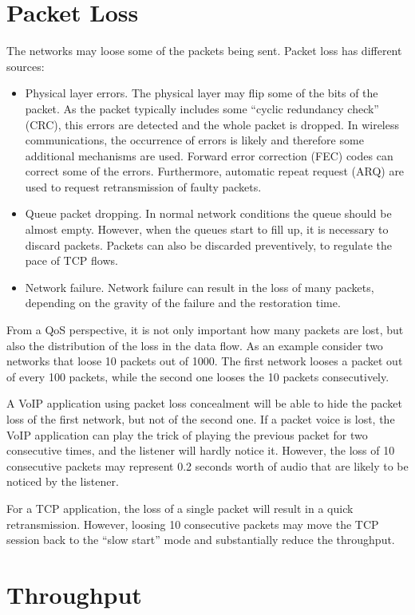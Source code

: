 \section{Packet Loss}

The networks may loose some of the packets being sent.
Packet loss has different sources:
\begin{itemize}
\item Physical layer errors. 
The physical layer may flip some of the bits of the packet.
As the packet typically includes some ``cyclic redundancy check'' (CRC), this errors are detected and the whole packet is dropped.
In wireless communications, the occurrence of errors is likely and therefore some additional mechanisms are used.
Forward error correction (FEC) codes can correct some of the errors.
Furthermore, automatic repeat request (ARQ) are used to request retransmission of faulty packets.
\item Queue packet dropping.
In normal network conditions the queue should be almost empty.
However, when the queues start to fill up, it is necessary to discard packets.
Packets can also be discarded preventively, to regulate the pace of TCP flows.
\item Network failure.
Network failure can result in the loss of many packets, depending on the gravity of the failure and the restoration time.
\end{itemize}

From a QoS perspective, it is not only important how many packets are lost, but also the distribution of the loss in the data flow.
As an example consider two networks that loose 10 packets out of 1000. 
The first network looses a packet out of every 100 packets, while the second one looses the 10 packets consecutively. 

A VoIP application using packet loss concealment will be able to hide the packet loss of the first network, but not of the second one.
If a packet voice is lost, the VoIP application can play the trick of playing the previous packet for two consecutive times, and the listener will hardly notice it.
However, the loss of 10 consecutive packets may represent 0.2 seconds worth of audio that are likely to be noticed by the listener.

For a TCP application, the loss of a single packet will result in a quick retransmission.
However, loosing 10 consecutive packets may move the TCP session back to the ``slow start'' mode and substantially reduce the throughput.

\section{Throughput}

